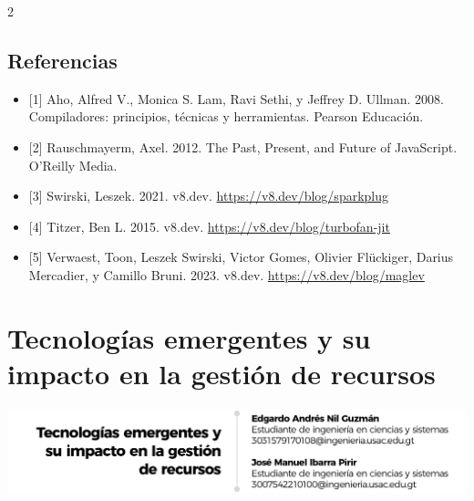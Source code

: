 \documentclass[12pt,spanish,Letterpaper,openany]{book}
\begin{document}
\begin {multicols}{2}
\hypertarget{referencias-3}{%
\section{Referencias}\label{referencias-3}}

\begin{itemize}
\item
  {[}1{]} Aho, Alfred V., Monica S. Lam, Ravi Sethi, y Jeffrey D. Ullman. 2008. Compiladores: principios, técnicas y herramientas. Pearson Educación.
\item
  {[}2{]} Rauschmayerm, Axel. 2012. The Past, Present, and Future of JavaScript. O'Reilly Media.
\item
  {[}3{]} Swirski, Leszek. 2021. v8.dev. \url{https://v8.dev/blog/sparkplug}
\item
  {[}4{]} Titzer, Ben L. 2015. v8.dev. \url{https://v8.dev/blog/turbofan-jit}
\item
  {[}5{]} Verwaest, Toon, Leszek Swirski, Victor Gomes, Olivier Flückiger, Darius Mercadier, y Camillo Bruni. 2023. v8.dev. \url{https://v8.dev/blog/maglev}
\end{itemize}

\end {multicols}

\medskip

\hypertarget{pareja47}{%
\chapter{Tecnologías emergentes y su impacto en la gestión de recursos}\label{pareja47}}

\begin{center}\includegraphics[width=1\linewidth]{autores/pareja47_01} \end{center}
\end{document}
